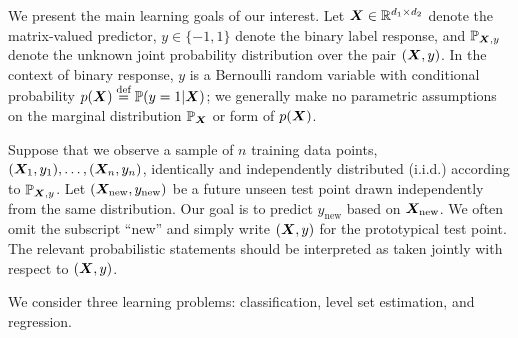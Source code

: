 \documentclass[11pt]{article}
\theoremstyle{plain}
\theoremstyle{definition}
\begin{document}
We present the main learning goals of our interest. Let $\bm X\in\mathbb{R}^{d_1\times d_2}$ denote the matrix-valued predictor, $y\in\{-1,1\}$ denote the binary label response, and $\mathbb{P}_{\bm X,y}$ denote the unknown joint probability distribution over the pair $(\bm X,y)$. In the context of binary response, $y$ is a Bernoulli random variable with conditional probability $p(\bm X)\stackrel{\text{def}}{=}\mathbb{P}(y=1|\bm X)$; we generally make no parametric assumptions on the marginal distribution $\mathbb{P}_{\bm X}$ or form of $p(\bm X)$. 


Suppose that we observe a sample of $n$ training data points, $(\bm X_1,y_1),\ldots,(\bm X_n,y_n)$, identically and independently distributed (i.i.d.) according to $\mathbb{P}_{\bm X,y}$. Let $(\bm X_{\text{new}},y_{\text{new}})$ be a future unseen test point drawn independently from the same distribution. Our goal is to predict $y_{\text{new}}$ based on $\bm X_{\text{new}}$. We often omit the subscript ``new'' and simply write $(\bm X,y)$ for the prototypical test point. The relevant probabilistic statements should be interpreted as taken jointly with respect to $(\bm X,y)$.

We consider three learning problems: classification, level set estimation, and regression. 
\end{document}

